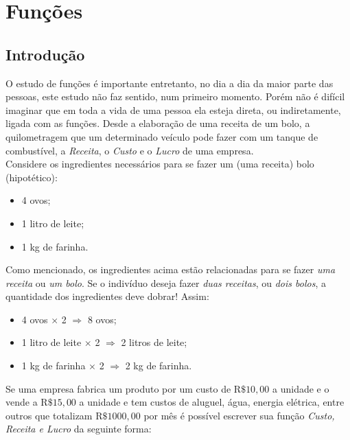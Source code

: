 
\chapter{Funções}
\section{Introdução}


\indent O estudo de funções é importante entretanto, no dia a dia da maior parte das pessoas, este estudo não faz sentido, num primeiro momento. Porém não é difícil imaginar que em toda a vida de uma pessoa ela esteja direta, ou indiretamente, ligada com as funções. Desde a elaboração de uma receita de um bolo, a quilometragem que um determinado veículo pode fazer com um tanque de combustível, a \textit{Receita}, o \textit{Custo} e o \textit{Lucro} de uma empresa.
\\
\indent Considere os ingredientes necessários para se fazer um (uma receita) bolo (hipotético):
\\

\begin{itemize}
	\item{4 ovos;}
	\item{1 litro de leite;}
	\item{1 kg de farinha.}
\end{itemize}
\vspace{.5cm}

Como mencionado, os ingredientes acima estão relacionadas para se fazer \textit{uma receita} ou \textit{um bolo}. Se o indivíduo deseja fazer \textit{duas receitas}, ou \textit{dois bolos}, a quantidade dos ingredientes deve dobrar! Assim:
\\

\begin{itemize}
	\item{4 ovos $\times$ 2 $\Rightarrow$ 8 ovos;}
	\item{1 litro de leite $\times$ 2 $\Rightarrow$ 2 litros de leite;}
	\item{1 kg de farinha $\times$ 2 $\Rightarrow$ 2 kg de farinha.}
\end{itemize}
\vspace{.5cm}

Se uma empresa fabrica um produto por um custo de $\mathrm{R}\$ 10,00$ a unidade e o vende a $\mathrm{R}\$ 15,00$ a unidade e tem custos de aluguel, água, energia elétrica, entre outros que totalizam $\mathrm{R}\$ 1000,00$ por mês é possível escrever sua função \textit{Custo, Receita e Lucro} da seguinte forma:

